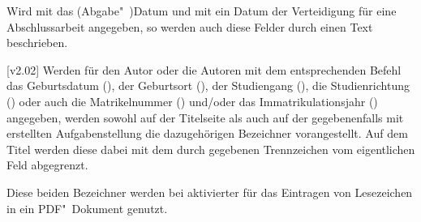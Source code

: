 \begin{DeclareEntity*}{}
\begin{DeclareEntity*}{}
\begin{DeclareEntity*}{}
\begin{Declaration}
  {}
\begin{Declaration}
  {}
Wird mit  das (Abgabe"~)Datum und mit  ein Datum 
der Verteidigung für eine Abschlussarbeit angegeben, so werden auch diese 
Felder durch einen Text beschrieben.
\TermTable%
%
\end{Declaration}
\end{Declaration}

\begin{Declaration}
  {}
\begin{Declaration}
  {}
\begin{Declaration}
  {}
\begin{Declaration}
  {}
\begin{Declaration}
  {}
\begin{Declaration}
  {}
  [v2.02]
Werden für den Autor oder die Autoren mit dem entsprechenden Befehl das 
Geburtsdatum (), der Geburtsort (), der 
Studiengang (), die Studienrichtung () oder 
auch die Matrikelnummer () und/oder das 
Immatrikulationsjahr () angegeben, werden sowohl auf 
der Titelseite als auch auf der gegebenenfalls mit  
erstellten Aufgabenstellung die dazugehörigen Bezeichner vorangestellt. Auf 
dem Titel werden diese dabei mit dem durch  gegebenen 
Trennzeichen vom eigentlichen Feld abgegrenzt.
\TermTable%
\end{Declaration}
\end{Declaration}
\end{Declaration}
\end{Declaration}
\end{Declaration}
\end{Declaration}

\begin{Declaration}
  {}
\begin{Declaration}
  {}
Diese beiden Bezeichner werden bei aktivierter  für das 
Eintragen von Lesezeichen in ein PDF"~Dokument genutzt.
\TermTable%
\end{Declaration}
\end{Declaration}


\end{DeclareEntity*}
\end{DeclareEntity*}
\end{DeclareEntity*}
